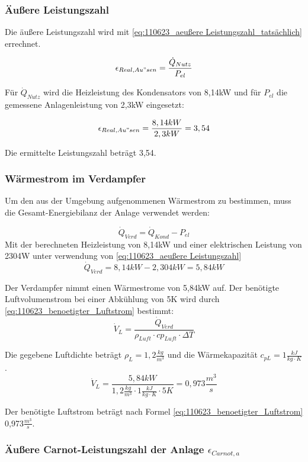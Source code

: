 \subsubsection{Äußere Leistungszahl}
Die äußere Leistungszahl wird mit \autoref{eq:110623_aeußere Leistungszahl_tatsächlich} errechnet. 

\begin{equation}
\epsilon_{Real,Au"sen} = \frac{\dot Q_{Nutz}}{P_{el}}
\label{eq:110623_aeußere Leistungszahl_tatsächlich}
\end{equation}

Für $\dot Q_{Nutz}$ wird die Heizleistung des Kondensators von 8,14kW und für $P_{el}$ die gemessene Anlagenleistung von 2,3kW eingesetzt:

$$ \epsilon_{Real,Au"sen} = \frac{8,14 kW}{2,3 kW} = 3,54$$

Die ermittelte Leistungszahl beträgt 3,54.

\subsubsection{Wärmestrom im Verdampfer}
Um den aus der Umgebung aufgenommenen Wärmestrom zu bestimmen, muss die Gesamt-Energiebilanz der Anlage verwendet werden:

\begin{equation}
\dot Q_{Verd}=\dot Q_{Kond}-P_{el}
\label{eq:110623_aeußere Leistungszahl}
\end{equation}
Mit der berechneten Heizleistung von 8,14kW und einer elektrischen Leistung von 2304W unter verwendung von \autoref{eq:110623_aeußere Leistungszahl}
$$\dot Q_{Verd}= 8,14 kW-2,304 kW= 5,84kW $$


Der Verdampfer nimmt einen Wärmestrome von 5,84kW auf.
Der benötigte Luftvolumenstrom bei einer Abkühlung von 5K wird durch \autoref{eq:110623_benoetigter_Luftstrom} bestimmt:
\begin{equation}
\dot V_{L}=\frac{\dot Q_{Verd}}{\rho_{Luft} \cdot cp_{Luft} \cdot \Delta T}
\label{eq:110623_benoetigter_Luftstrom}
\end{equation}

Die gegebene Luftdichte  beträgt $\rho_L = 1,2\frac{kg}{m^3}$ und die Wärmekapazität $c_{pL}= 1\frac{kJ}{kg \cdot K}$. 
$$\dot V_{L}=\frac{5,84 kW}{ 1,2 \frac{kg}{m^3} \cdot 1 \frac{kJ}{kg \cdot K} \cdot 5K}= 0,973 \frac{m^3}{s}$$


Der benötigte Luftstrom beträgt nach Formel \ref{eq:110623_benoetigter_Luftstrom} 0,973$\frac{m^3}{s}$. 
\subsubsection{Äußere Carnot-Leistungszahl der Anlage \texorpdfstring{$\epsilon_{Carnot,a}$}{}}
\label{subsubsec:Carnot}

